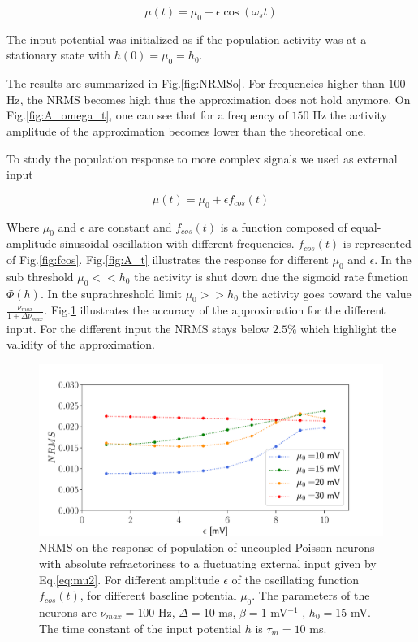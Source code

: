 \documentclass[12pt,twoside]{report}
\begin{document}
\begin{equation}
\label{eq:mut}
\mu(t)=\mu_0 + \epsilon \cos(\omega_st)
\end{equation}

The input potential was initialized as if the population activity was at a stationary state with $h(0)=\mu_0=h_0$. 

The results are summarized in Fig.\ref{fig:NRMSo}. For frequencies higher than $100$ Hz, the NRMS becomes high thus the approximation does not hold anymore. On Fig.\ref{fig:A_omega_t}, one can see that for a frequency of $150$ Hz the activity amplitude of the approximation becomes lower than the theoretical one.

To study the population response to more complex signals we used as external input

\begin{equation}
\label{eq:mu2}
\mu(t)=\mu_0+\epsilon f_{cos}(t)
\end{equation} 


Where $\mu_0$ and $\epsilon$ are constant and $f_{cos}(t)$  is a function composed of equal-amplitude sinusoidal oscillation with different frequencies. $f_{cos}(t)$ is represented of Fig.\ref{fig:fcos}. Fig.\ref{fig:A_t} illustrates the response for different $\mu_0$ and $\epsilon$. In the sub threshold $\mu_0<<h_0$ the activity is shut down due the sigmoid rate function $\Phi(h)$. In the suprathreshold limit $\mu_0>>h_0$ the activity goes toward the value $\frac{\nu_{max}}{1+\Delta\nu_{max}}$. Fig.\ref{fig:NRMSe} illustrates the accuracy of the approximation for the different input. For the different input the NRMS stays below $2.5\%$ which highlight the validity of the approximation.

\begin{figure}[h!]
	\centering
	\includegraphics[width=0.8\linewidth]{NRMSe.pdf}
	\caption{NRMS on the response of population of uncoupled Poisson neurons with absolute refractoriness to a fluctuating external input given by Eq.\eqref{eq:mu2}. For different amplitude $\epsilon$ of the oscillating function $f_{cos}(t)$, for different baseline potential $\mu_0$. The parameters of the neurons are $\nu_{max}=100$ Hz, $\Delta=10$ ms, $\beta=1$ mV$^{-1}$ , $h_0=15$ mV. The time constant of the input potential $h$ is $\tau_m=10$ ms.
	}
	\label{fig:NRMSe}
\end{figure}
\end{document}
